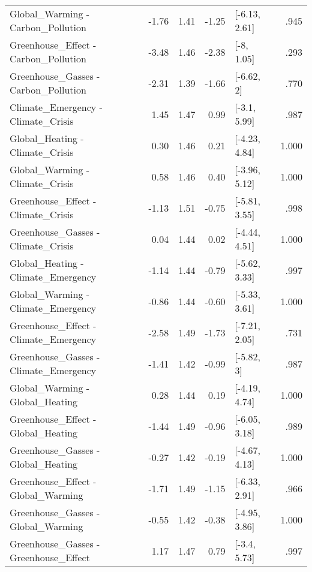 \begin{table}[ht]
\begin{tabular}{lrrrlr}
  Global\_Warming - Carbon\_Pollution & -1.76 & 1.41 & -1.25 & [-6.13, 2.61] & .945 \\ 
  Greenhouse\_Effect - Carbon\_Pollution & -3.48 & 1.46 & -2.38 & [-8, 1.05] & .293 \\ 
  Greenhouse\_Gasses - Carbon\_Pollution & -2.31 & 1.39 & -1.66 & [-6.62, 2] & .770 \\ 
  Climate\_Emergency - Climate\_Crisis & 1.45 & 1.47 & 0.99 & [-3.1, 5.99] & .987 \\ 
  Global\_Heating - Climate\_Crisis & 0.30 & 1.46 & 0.21 & [-4.23, 4.84] & 1.000 \\ 
  Global\_Warming - Climate\_Crisis & 0.58 & 1.46 & 0.40 & [-3.96, 5.12] & 1.000 \\ 
  Greenhouse\_Effect - Climate\_Crisis & -1.13 & 1.51 & -0.75 & [-5.81, 3.55] & .998 \\ 
  Greenhouse\_Gasses - Climate\_Crisis & 0.04 & 1.44 & 0.02 & [-4.44, 4.51] & 1.000 \\ 
  Global\_Heating - Climate\_Emergency & -1.14 & 1.44 & -0.79 & [-5.62, 3.33] & .997 \\ 
  Global\_Warming - Climate\_Emergency & -0.86 & 1.44 & -0.60 & [-5.33, 3.61] & 1.000 \\ 
  Greenhouse\_Effect - Climate\_Emergency & -2.58 & 1.49 & -1.73 & [-7.21, 2.05] & .731 \\ 
  Greenhouse\_Gasses - Climate\_Emergency & -1.41 & 1.42 & -0.99 & [-5.82, 3] & .987 \\ 
  Global\_Warming - Global\_Heating & 0.28 & 1.44 & 0.19 & [-4.19, 4.74] & 1.000 \\ 
  Greenhouse\_Effect - Global\_Heating & -1.44 & 1.49 & -0.96 & [-6.05, 3.18] & .989 \\ 
  Greenhouse\_Gasses - Global\_Heating & -0.27 & 1.42 & -0.19 & [-4.67, 4.13] & 1.000 \\ 
  Greenhouse\_Effect - Global\_Warming & -1.71 & 1.49 & -1.15 & [-6.33, 2.91] & .966 \\ 
  Greenhouse\_Gasses - Global\_Warming & -0.55 & 1.42 & -0.38 & [-4.95, 3.86] & 1.000 \\ 
  Greenhouse\_Gasses - Greenhouse\_Effect & 1.17 & 1.47 & 0.79 & [-3.4, 5.73] & .997 \\ 
   \hline
\end{tabular}
\end{table}
